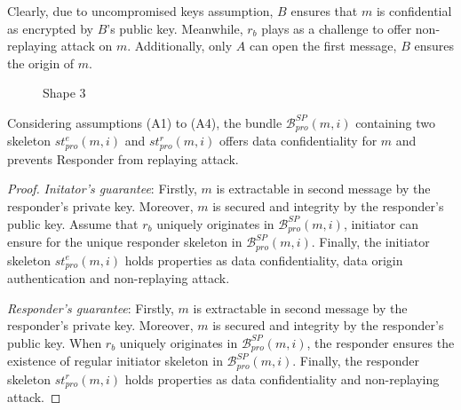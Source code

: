 Clearly, due to uncompromised keys assumption, $B$ ensures that $m$ is confidential as encrypted by $B$'s public key. Meanwhile, $r_b$ plays as a challenge to offer non-replaying attack on $m$. Additionally, only $A$ can open the first message, $B$ ensures the origin of $m$.  

\begin{figure}
\begin{center}
\end{center}
\caption{Shape 3} 
\label{protocol3}
\end{figure}

\begin{Proposition}
Considering assumptions (A1) to (A4), the bundle $\mathcal{B}^{SP}_{pro}(m,i)$ containing two skeleton $st^e_{pro}(m,i)$ and $st^r_{pro}(m,i)$ offers data confidentiality for $m$ and prevents Responder from replaying attack. 
\end{Proposition}

\begin{proof}
\emph{Initator's guarantee}: Firstly, $m$ is extractable in second message by the responder's private key. Moreover, $m$ is secured and integrity by the responder's public key. Assume that $r_b$ uniquely originates in $\mathcal{B}^{SP}_{pro}(m,i)$, initiator can ensure for the unique responder skeleton in $\mathcal{B}^{SP}_{pro}(m,i)$. Finally, the initiator skeleton $st^e_{pro}(m,i)$ holds properties as data confidentiality, data origin authentication and non-replaying attack.

\emph{Responder's guarantee}: Firstly, $m$ is extractable in second message by the responder's private key. Moreover, $m$ is secured and integrity by the responder's public key. When $r_b$ uniquely originates in $\mathcal{B}^{SP}_{pro}(m,i)$, the responder ensures the existence of regular initiator skeleton in $\mathcal{B}^{SP}_{pro}(m,i)$. Finally, the responder skeleton $st^r_{pro}(m,i)$ holds properties as data confidentiality and non-replaying attack.
 \end{proof}

